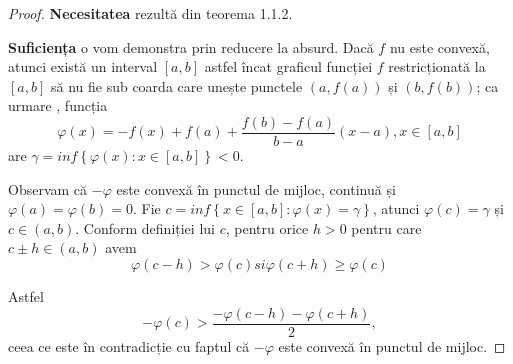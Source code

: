 \documentclass[a4paper,12pt,oneside]{report}
\begin{document}
\begin{proof}
\textbf{Necesitatea }rezultă din teorema 1.1.2.

\textbf{Suficiența} o vom demonstra prin reducere la absurd. Dacă \(f\) nu este convexă, atunci există un interval \(\left [ a,b \right ]\) astfel încat graficul funcției \(f\) restricționată la  \(\left [ a,b \right ]\) să nu fie sub coarda care unește punctele \(\left ( a, f\left ( a \right ) \right )\) și \(\left ( b, f\left ( b \right ) \right )\); ca urmare , funcția
\begin{displaymath}
  \varphi \left ( x \right )= -f\left ( x \right ) + f\left ( a \right )+ \frac{f\left ( b \right )- f\left ( a \right )}{b-a}\left ( x-a \right ), x\in \left [ a,b \right ]
\end{displaymath}
are  \(\gamma = inf \left \{ \varphi \left ( x \right ) : x\in \left [ a,b \right ]\right \}< 0\).

Observam că \(-\varphi\) este convexă în punctul de mijloc, continuă și \(\varphi \left ( a \right ) =\varphi \left ( b \right ) = 0\). Fie \(c = inf \left \{ x \in \left [ a,b  \right ] : \varphi \left ( x \right )= \gamma \right \} \), atunci \(\varphi \left ( c \right ) = \gamma\)  și \(c \in \left ( a,b  \right )\). Conform definiției lui \(c\), pentru orice \(h>0\) pentru care \(c\pm h\in \left ( a,b \right )\) avem
\begin{displaymath}
  \varphi \left ( c - h  \right )> \varphi \left ( c \right ) si \varphi \left ( c + h  \right )\geq  \varphi \left ( c \right )
\end{displaymath}

Astfel
\begin{displaymath}
  -\varphi \left ( c \right )> \frac{-\varphi \left ( c-h \right )-\varphi \left ( c+h \right )}{2},
\end{displaymath}
ceea ce este în contradicție cu faptul că \(-\varphi\) este convexă în punctul de mijloc.
\end{proof}
\end{document}
